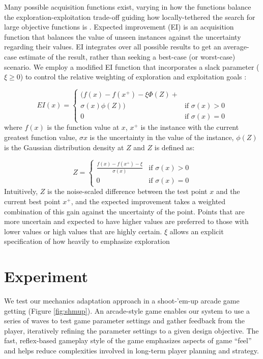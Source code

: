 \documentclass[letterpaper]{article}
\begin{document}
Many possible acquisition functions exist, varying in how the functions balance the exploration-exploitation trade-off guiding how locally-tethered the search for large objective functions is \cite{settles2012:al-book}. Expected improvement (EI) is an acquisition function that balances the value of unseen instances against the uncertainty regarding their values. EI integrates over all possible results to get an average-case estimate of the result, rather than seeking a best-case (or worst-case) scenario. We employ a modified EI function that incorporates a slack parameter ($\xi \ge 0$) to control the relative weighting of exploration and exploitation goals :


$$ EI(x) = \begin{cases} 
(f(x) - f(x^{+}) - \xi \Phi(Z) + \\ \sigma(x) \phi(Z)) & \mbox{if } \sigma(x) > 0 \\ 
0 & \mbox{if } \sigma(x) = 0 
\end{cases} $$
where $f(x)$ is the function value at $x$, $x^{+}$ is the instance with the current greatest function value, $\sigma{x}$ is the uncertainty in the value of the instance, $\phi(Z)$ is the Gaussian distribution density at $Z$ and $Z$ is defined as:

$$ Z = \begin{cases} 
\frac{f(x) - f(x^{+}) - \xi}{\sigma(x)} & \mbox{if } \sigma(x) > 0 \\ 
0 & \mbox{if } \sigma(x) = 0 
\end{cases} $$
Intuitively, $Z$ is the noise-scaled difference between the test point $x$ and the current best point $x^{+}$, and the expected improvement takes a weighted combination of this gain against the uncertainty of the point. Points that are more uncertain and expected to have higher values are preferred to those with lower values or high values that are highly certain. $\xi$ allows an explicit specification of how heavily to emphasize exploration



\section{Experiment}
We test our mechanics adaptation approach in a shoot-'em-up arcade game getting (Figure \ref{fig:shmup}). An arcade-style game enables our system to use a series of waves to test game parameter settings and gather feedback from the player, iteratively refining the parameter settings to a given design objective. The fast, reflex-based gameplay style of the game emphasizes aspects of game ``feel'' and helps reduce complexities involved in long-term player planning and strategy.
\end{document}
